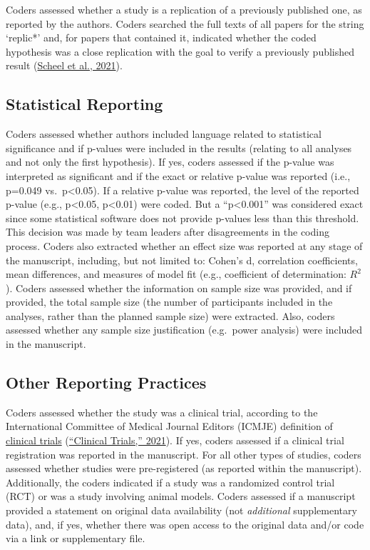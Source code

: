 \documentclass[]{cik}%
\begin{document}
Coders assessed whether a study is a replication of a previously
published one, as reported by the authors. Coders searched the full
texts of all papers for the string `replic*' and, for papers that
contained it, indicated whether the coded hypothesis was a close
replication with the goal to verify a previously published result
(\protect\hyperlink{ref-scheel_excess_2020}{Scheel et al., 2021}).

\hypertarget{statistical-reporting}{%
\subsection{Statistical Reporting}\label{statistical-reporting}}

Coders assessed whether authors included language related to statistical
significance and if p-values were included in the results (relating to
all analyses and not only the first hypothesis). If yes, coders assessed
if the p-value was interpreted as significant and if the exact or
relative p-value was reported (i.e., p=0.049 vs.~p\textless0.05). If a
relative p-value was reported, the level of the reported p-value (e.g.,
p\textless0.05, p\textless0.01) were coded. But a ``p\textless0.001''
was considered exact since some statistical software does not provide
p-values less than this threshold. This decision was made by team
leaders after disagreements in the coding process. Coders also extracted
whether an effect size was reported at any stage of the manuscript,
including, but not limited to: Cohen's d, correlation coefficients, mean
differences, and measures of model fit (e.g., coefficient of
determination: \(R^2\)). Coders assessed whether the information on
sample size was provided, and if provided, the total sample size (the
number of participants included in the analyses, rather than the planned
sample size) were extracted. Also, coders assessed whether any sample
size justification (e.g.~power analysis) were included in the
manuscript.

\hypertarget{other-reporting-practices}{%
\subsection{Other Reporting Practices}\label{other-reporting-practices}}

Coders assessed whether the study was a clinical trial, according to the
International Committee of Medical Journal Editors (ICMJE) definition of
\href{http://www.icmje.org/recommendations/browse/publishing-and-editorial-issues/clinical-trial-registration.html}{clinical
trials} (\protect\hyperlink{ref-icmje}{{``Clinical Trials,''} 2021}). If
yes, coders assessed if a clinical trial registration was reported in
the manuscript. For all other types of studies, coders assessed whether
studies were pre-registered (as reported within the manuscript).
Additionally, the coders indicated if a study was a randomized control
trial (RCT) or was a study involving animal models. Coders assessed if a
manuscript provided a statement on original data availability (not
\emph{additional} supplementary data), and, if yes, whether there was
open access to the original data and/or code via a link or supplementary
file.
\end{document}
